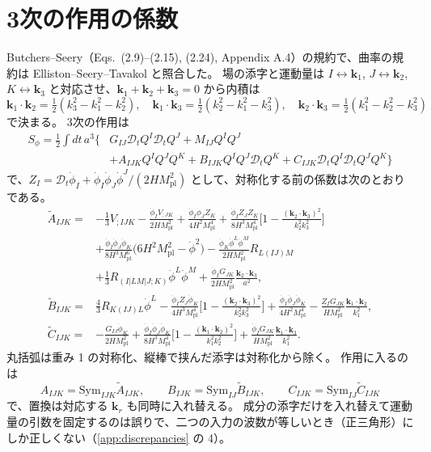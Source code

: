 \documentclass[a4paper,11pt]{ltjsarticle}
\newcommand{\Mpl}{M_{\mathrm{pl}}}
\newcommand{\Dt}{\mathcal{D}_t}
\begin{document}
\section{3次の作用の係数}
\label{app:cubic}

Butchers--Seery\cite{BS2018}（Eqs.~(2.9)--(2.15), (2.24), Appendix A.4）の規約で、曲率の規約は Elliston--Seery--Tavakol\cite{EST2012} と照合した。
場の添字と運動量は $I\leftrightarrow\mathbf k_1$, $J\leftrightarrow\mathbf k_2$, $K\leftrightarrow\mathbf k_3$ と対応させ、$\mathbf k_1+\mathbf k_2+\mathbf k_3=0$ から内積は
\[
\mathbf k_1\!\cdot\!\mathbf k_2=\tfrac12(k_3^2-k_1^2-k_2^2),\quad
\mathbf k_1\!\cdot\!\mathbf k_3=\tfrac12(k_2^2-k_1^2-k_3^2),\quad
\mathbf k_2\!\cdot\!\mathbf k_3=\tfrac12(k_1^2-k_2^2-k_3^2)
\]
で決まる。
3次の作用は
\begin{align*}
S_\phi=\frac12\int dt\,a^3\Big\{&G_{IJ}\Dt Q^I\Dt Q^J+M_{IJ}Q^IQ^J\\
&+A_{IJK}Q^IQ^JQ^K+B_{IJK}Q^IQ^J\Dt Q^K+C_{IJK}\Dt Q^I\Dt Q^JQ^K\Big\}
\end{align*}
で、$Z_I=\Dt\dot\phi_I+\dot\phi_I\dot\phi_J\dot\phi^J/(2H\Mpl^2)$ として、対称化する前の係数は次のとおりである。
\begin{align*}
\widetilde A_{IJK}={}&-\frac13V_{;IJK}-\frac{\dot\phi_IV_{;JK}}{2H\Mpl^2}+\frac{\dot\phi_I\dot\phi_JZ_K}{4H^2\Mpl^4}
+\frac{\dot\phi_IZ_JZ_K}{8H^3\Mpl^4}\Big[1-\frac{(\mathbf k_2\cdot\mathbf k_3)^2}{k_2^2k_3^2}\Big]\\
&+\frac{\dot\phi_I\dot\phi_J\dot\phi_K}{8H^3\Mpl^6}\big(6H^2\Mpl^2-\dot\phi^2\big)
-\frac{\dot\phi_K\dot\phi^L\dot\phi^M}{2H\Mpl^2}R_{L(IJ)M}\\
&+\frac13R_{(I|LM|J;K)}\dot\phi^L\dot\phi^M
+\frac{\dot\phi_IG_{JK}}{2H\Mpl^2}\frac{\mathbf k_2\cdot\mathbf k_3}{a^2},\\
\widetilde B_{IJK}={}&\frac43R_{K(IJ)L}\dot\phi^L-\frac{\dot\phi_IZ_J\dot\phi_K}{4H^3\Mpl^4}\Big[1-\frac{(\mathbf k_2\cdot\mathbf k_3)^2}{k_2^2k_3^2}\Big]
+\frac{\dot\phi_I\dot\phi_J\dot\phi_K}{4H^2\Mpl^4}-\frac{Z_IG_{JK}}{H\Mpl^2}\frac{\mathbf k_1\cdot\mathbf k_2}{k_1^2},\\
\widetilde C_{IJK}={}&-\frac{G_{IJ}\dot\phi_K}{2H\Mpl^2}+\frac{\dot\phi_I\dot\phi_J\dot\phi_K}{8H^3\Mpl^4}\Big[1-\frac{(\mathbf k_1\cdot\mathbf k_2)^2}{k_1^2k_2^2}\Big]
+\frac{\dot\phi_IG_{JK}}{H\Mpl^2}\frac{\mathbf k_1\cdot\mathbf k_3}{k_1^2}.
\end{align*}
丸括弧は重み 1 の対称化、縦棒で挟んだ添字は対称化から除く。
作用に入るのは
\[
A_{IJK}=\mathrm{Sym}_{IJK}\widetilde A_{IJK},\qquad B_{IJK}=\mathrm{Sym}_{IJ}\widetilde B_{IJK},\qquad C_{IJK}=\mathrm{Sym}_{IJ}\widetilde C_{IJK}
\]
で、置換は対応する $\mathbf k_r$ も同時に入れ替える。
成分の添字だけを入れ替えて運動量の引数を固定するのは誤りで、二つの入力の波数が等しいとき（正三角形）にしか正しくない（\ref{app:discrepancies} の 4）。
\end{document}
